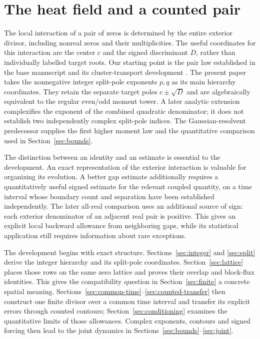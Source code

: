 \section{The heat field and a counted pair}
\label{sec:framework}

The local interaction of a pair of zeros is determined by the entire
exterior divisor, including nonreal zeros and their multiplicities.
The useful coordinates for this interaction are the center $c$ and the
signed discriminant $D$, rather than individually labelled target roots.
Our starting point is the pair law established in the base manuscript
and its cluster-transport development \cite{BakerBase,BakerGT41}.
The present paper takes the nonnegative integer split-pole exponents
$p,q$ as its main hierarchy coordinates. They retain the separate
target poles $c\pm\sqrt D$ and are algebraically equivalent to the
regular even/odd moment tower. A later analytic extension complexifies
the exponent of the combined quadratic denominator; it does not
establish two independently complex split-pole indices.
The Gaussian-resolvent predecessor \cite{BakerGR02,BakerGR05,BakerGR07}
supplies the first higher moment law and the quantitative comparison
used in Section~\ref{sec:bounds}.

The distinction between an identity and an estimate is essential to the
development. An exact representation of the exterior interaction is
valuable for organizing its evolution. A better gap estimate additionally
requires a quantitatively useful signed estimate for the relevant
coupled quantity, on a time interval whose boundary count and separation
have been established independently.
The later all-real comparison uses an additional source of sign: each
exterior denominator of an adjacent real pair is positive. This gives
an explicit local backward allowance from neighboring gaps, while its
statistical application still requires information about rare exceptions.

The development begins with exact structure. Sections~\ref{sec:integer}
and \ref{sec:split} derive the integer hierarchy and its split-pole
coordinates. Section~\ref{sec:lattice} places those rows on the same zero
lattice and proves their overlap and block-flux identities. This gives the
compatibility question in Section~\ref{sec:finite} a concrete spatial
meaning. Sections~\ref{sec:common-time}--\ref{sec:counted-transfer}
then construct one finite divisor over a common time interval and transfer
its explicit errors through counted contours; Section~\ref{sec:conditioning}
examines the quantitative limits of those allowances.
Complex exponents, contours and signed forcing then lead to the
joint dynamics in Sections~\ref{sec:bounds}--\ref{sec:joint}.

